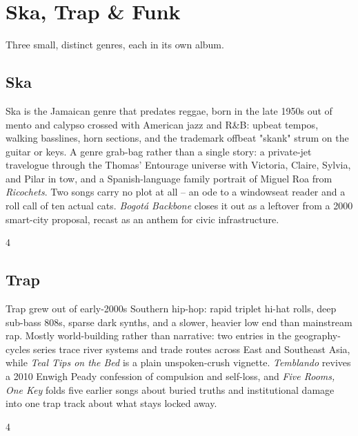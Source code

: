 \documentclass[a4paper,landscape]{memoir}
\begin{document}
\part{Ska, Trap \& Funk}
Three small, distinct genres, each in its own album.

\chapter{Ska}
Ska is the Jamaican genre that predates reggae, born in the late 1950s out of mento and calypso crossed with American jazz and R\&B: upbeat tempos, walking basslines, horn sections, and the trademark offbeat "skank" strum on the guitar or keys. A genre grab-bag rather than a single story: a private-jet travelogue through the Thomas' Entourage universe with Victoria, Claire, Sylvia, and Pilar in tow, and a Spanish-language family portrait of Miguel Roa from \emph{Ricochets}. Two songs carry no plot at all -- an ode to a windowseat reader and a roll call of ten actual cats. \emph{Bogotá Backbone} closes it out as a leftover from a 2000 smart-city proposal, recast as an anthem for civic infrastructure.
\clearpage\begin{multicols*}{4}
\end{multicols*}

\chapter{Trap}
Trap grew out of early-2000s Southern hip-hop: rapid triplet hi-hat rolls, deep sub-bass 808s, sparse dark synths, and a slower, heavier low end than mainstream rap. Mostly world-building rather than narrative: two entries in the geography-cycles series trace river systems and trade routes across East and Southeast Asia, while \emph{Teal Tips on the Bed} is a plain unspoken-crush vignette. \emph{Temblando} revives a 2010 Enwigh Peady confession of compulsion and self-loss, and \emph{Five Rooms, One Key} folds five earlier songs about buried truths and institutional damage into one trap track about what stays locked away.
\clearpage\begin{multicols*}{4}
\end{multicols*}
\end{document}

